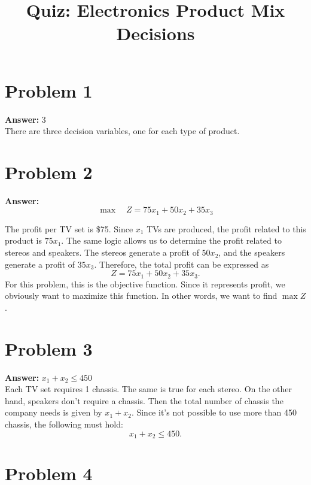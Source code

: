 \documentclass[11pt]{article}
\date{}
\title{Quiz: Electronics Product Mix Decisions}
\begin{document}
\thispagestyle{empty}
\pagestyle{empty}
\section*{Problem 1}
\label{sec:org9e76f8e}

\textbf{Answer:} 3\\

There are three decision variables, one for each type of product.
\section*{Problem 2}
\label{sec:orgd3471f3}

\textbf{Answer:}
\begin{equation*}
\max\quad Z=75x_1+50x_2+35x_3
\end{equation*}
\vspace{0.1cm}

The profit per TV set is \$75. Since \(x_1\) TVs are produced, the profit
related to this product is \(75x_1\). The same logic allows us to determine
the profit related to stereos and speakers. The stereos generate a profit of
\(50x_2\), and the speakers generate a profit of \(35x_3\). Therefore, the
total profit can be expressed as
\begin{equation}
Z=75x_1+50x_2+35x_3.
\end{equation}
For this problem, this is the objective function. Since it represents profit, we
obviously want to maximize this function. In other words, we want to find
\(\max Z\).
\section*{Problem 3}
\label{sec:orgd435435}

\textbf{Answer:} \(x_1+x_2\leq 450\)\\

Each TV set requires 1 chassis. The same is true for each stereo. On the other
hand, speakers don't require a chassis. Then the total number of chassis the
company needs is given by \(x_1+x_2\). Since it's not possible to use more
than 450 chassis, the following must hold:
\begin{equation}
x_1+x_2\leq 450.
\end{equation}
\section*{Problem 4}
\label{sec:org5e15bdc}
\end{document}
